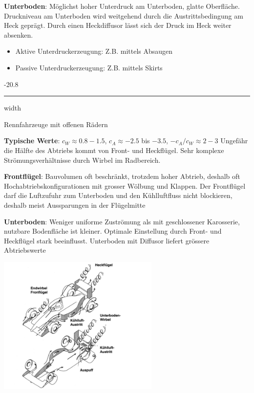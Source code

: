 \documentclass[8pt, landscape, fleqn]{scrartcl}
\makeatletter
\renewcommand{\subsubsection}{\@startsection{subsubsection}{1}{0mm}%
{-2\baselineskip}{0.8\baselineskip}%
{\hrule depth 0.2pt width\columnwidth\vspace*{1.2em}\normalsize\bfseries\rmfamily}}
\makeatother
\begin{document}
\begin{multicols*}{3}
\textbf{Unterboden}: Möglichst hoher Unterdruck am Unterboden, glatte Oberfläche. Druckniveau am Unterboden wird weitgehend durch die Austrittsbedingung am Heck geprägt. 
Durch einen Heckdiffusor lässt sich der Druck im Heck weiter absenken.

\begin{itemize}
    \item Aktive Unterdruckerzeugung: Z.B. mittels Absaugen
    \item Passive Unterdruckerzeugung: Z.B. mittels Skirts 
\end{itemize}

\subsubsection{Rennfahrzeuge mit offenen Rädern}

\textbf{Typische Werte}: $c_W \approx 0.8-1.5$, $c_A \approx -2.5$ bis $-3.5$, $-c_A/c_W \approx 2 - 3$ 
Ungefähr die Hälfte des Abtriebs kommt von Front- und Heckflügel. Sehr komplexe Strömungsverhältnisse durch Wirbel im Radbereich.\newline \newline

\textbf{Frontflügel}: Bauvolumen oft beschränkt, trotzdem hoher Abtrieb, deshalb oft Hochabtriebskonfigurationen mit grosser Wölbung und Klappen. Der Frontflügel darf die Luftzufuhr zum Unterboden
und den Kühlluftfluss nicht blockieren, deshalb meist Aussparungen in der Flügelmitte \newline \newline

\textbf{Unterboden}: Weniger uniforme Zuströmung als mit geschlossener Karosserie, nutzbare Bodenfläche ist kleiner. Optimale Einstellung durch Front- und Heckflügel stark 
beeinflusst. Unterboden mit Diffusor liefert grössere Abtriebswerte

\begin{center}
    \includegraphics[width=8cm]{F_1_Wirbel.png}
\end{center}


\end{multicols*}
\end{document}

